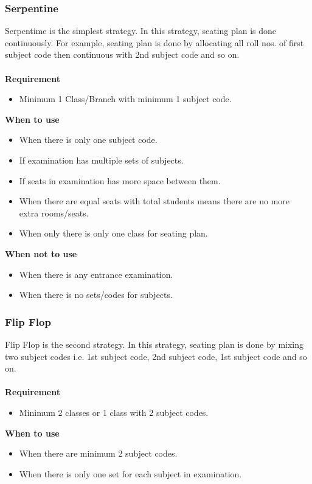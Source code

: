 \subsubsection{Serpentine}
Serpentime is the simplest strategy. In this strategy,
seating plan is done continuously. For example, seating plan is done
by allocating all roll nos. of first subject code then continuous with
2nd subject code and so on.\\ \\
{\bf Requirement}
\begin{itemize}
\item Minimum 1 Class/Branch with minimum 1 subject code.
\end{itemize}
{\bf When to use}
\begin{itemize}
\item When there is only one subject code.
\item If examination has multiple sets of subjects.
\item If seats in examination has more space between them.
\item When there are equal seats with total students means there are no more
extra rooms/seats.
\item When only there is only one class for seating plan.
\end{itemize}
{\bf When not to use}
\begin{itemize}
\item When there is any entrance examination.
\item When there is no sets/codes for subjects.
\end{itemize}



\subsubsection{Flip Flop}
Flip Flop is the second strategy. In this strategy, seating plan is
done by mixing two subject codes i.e. 1st subject code, 2nd subject
code, 1st subject code and so on.\\ \\
{\bf Requirement}
\begin{itemize}
\item Minimum 2 classes or 1 class with 2 subject codes.
\end{itemize}
{\bf When to use}
\begin{itemize}
\item When there are minimum 2 subject codes. 
\item When there is only one set for each subject in examination.
\end{itemize}

